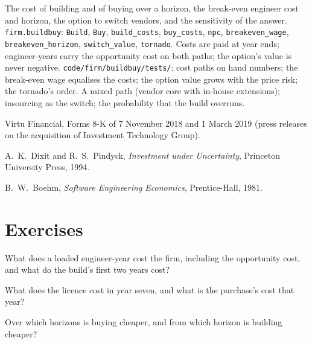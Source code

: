 \begin{build}
 The cost of building and of buying over a horizon, the break-even engineer cost and horizon, the option to switch vendors, and
the sensitivity of the answer.
 \texttt{firm.buildbuy}: \texttt{Build}, \texttt{Buy}, \texttt{build\_costs}, \texttt{buy\_costs}, \texttt{npc},
\texttt{breakeven\_wage}, \texttt{breakeven\_horizon}, \texttt{switch\_value}, \texttt{tornado}.
 Costs are paid at year ends; engineer-years carry the opportunity cost on both paths; the option's value is never negative.
 \texttt{code/firm/buildbuy/tests/}: cost paths on hand numbers; the break-even wage equalises the costs; the option value
grows with the price risk; the tornado's order.
 A mixed path (vendor core with in-house extensions); insourcing as the switch; the probability that the build overruns.
\end{build}

\begin{omsources}
\item Virtu Financial, Forms 8-K of 7 November 2018 and 1 March 2019 (press releases on the acquisition of Investment Technology Group).
\item A.~K.~Dixit and R.~S.~Pindyck, \emph{Investment under Uncertainty}, Princeton University Press, 1994.
\item B.~W.~Boehm, \emph{Software Engineering Economics}, Prentice-Hall, 1981.
\end{omsources}

\section{Exercises}

\begin{exercise}[$\star$]\label{exo:fm:build-against-buy:1}
What does a loaded engineer-year cost the firm, including the opportunity cost, and what do the build's first two years cost?
\end{exercise}

\begin{exercise}[$\star$]\label{exo:fm:build-against-buy:2}
What does the licence cost in year seven, and what is the purchase's cost that year?
\end{exercise}

\begin{exercise}[$\star$]\label{exo:fm:build-against-buy:3}
Over which horizons is buying cheaper, and from which horizon is building cheaper?
\end{exercise}

